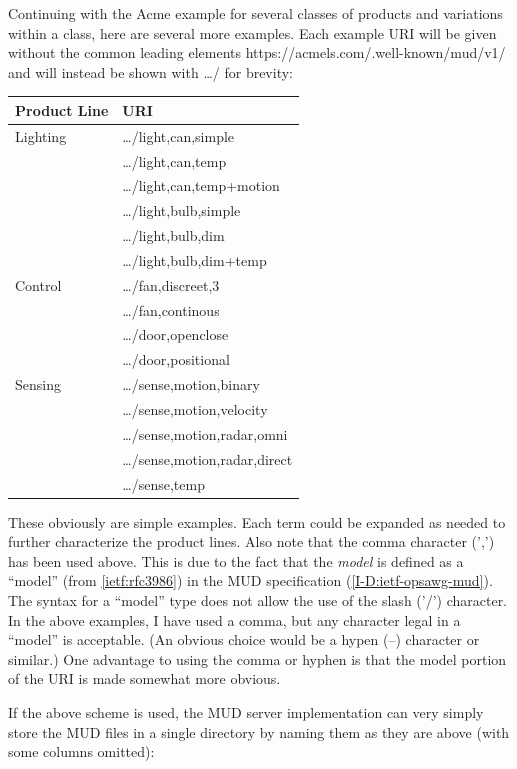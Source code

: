 \documentclass[conference]{IEEEtran}
\begin{document}
{Continuing with the Acme example for several classes of products and
variations within a class, here are several more examples.  Each
example URI will be given without the common leading elements
{\ttfamily\scriptsize https://acmels.com/.well-known/mud/v1/} and will
instead be shown with {\ttfamily\scriptsize \ldots/} for brevity:

\begin{tabular}{l|>{\ttfamily\scriptsize}l}
  Product Line & URI \\ \hline
  Lighting & \ldots/light,can,simple \\
  & \ldots/light,can,temp \\
  & \ldots/light,can,temp+motion \\
  & \ldots/light,bulb,simple \\
  & \ldots/light,bulb,dim \\
  & \ldots/light,bulb,dim+temp \\
  Control & \ldots/fan,discreet,3 \\
  & \ldots/fan,continous \\
  & \ldots/door,openclose \\
  & \ldots/door,positional \\
  Sensing & \ldots/sense,motion,binary \\
  & \ldots/sense,motion,velocity \\
  & \ldots/sense,motion,radar,omni \\
  & \ldots/sense,motion,radar,direct \\
  & \ldots/sense,temp
\end{tabular}

These obviously are simple examples.  Each term could be expanded as
needed to further characterize the product lines.  Also note that the
comma character (',') has been used above.  This is due to the fact
that the {\em model} is defined as a ``model'' (from
\ref{ietf:rfc3986}) in the MUD specification
(\ref{I-D:ietf-opsawg-mud}).  The syntax for a ``model'' type does not
allow the use of the slash ('/') character.  In the above examples, I
have used a comma, but any character legal in a ``model'' is
acceptable.  (An obvious choice would be a hypen (--) character or
similar.)  One advantage to using the comma or hyphen is that the
model portion of the URI is made somewhat more obvious.

If the above scheme is used, the MUD server implementation can very
simply store the MUD files in a single directory by naming them as
they are above (with some columns omitted):

}
\end{document}
